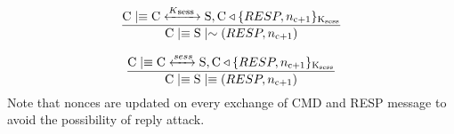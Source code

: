 \[ \frac{\textnormal{C} \mid\equiv \textnormal{C} \xleftrightarrow{K\textsubscript{sess }} \textnormal{S}, \textnormal{C} \triangleleft \lbrace RESP, n\textsubscript{c+1} \rbrace \textsubscript{K\textsubscript{sess}}}{ \textnormal{C} \mid\equiv \textnormal{S} \mid\sim (RESP,n\textsubscript{c+1})} 
\]

\[ \frac{\textnormal{C} \mid\equiv \textnormal{C} \xleftrightarrow{sess } \textnormal{S}, \textnormal{C} \triangleleft \lbrace RESP,n\textsubscript{c+1} \rbrace \textsubscript{K\textsubscript{sess}} }{\textnormal{C} \mid\equiv \textnormal{S} \mid\equiv (RESP,n\textsubscript{c+1})}
\]
Note that nonces are updated on every exchange of CMD and RESP message to avoid the possibility of reply attack.
